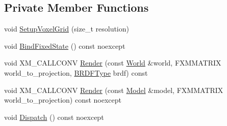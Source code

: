\subsection*{Private Member Functions}
\begin{DoxyCompactItemize}
\item 
void \hyperlink{classmage_1_1rendering_1_1_voxelization_pass_a09f3b3c1a08b28c3815fb4fa1f0611f5}{Setup\+Voxel\+Grid} (size\+\_\+t resolution)
\item 
void \hyperlink{classmage_1_1rendering_1_1_voxelization_pass_ae69d6465ab918f12940339436fe56c56}{Bind\+Fixed\+State} () const noexcept
\item 
void X\+M\+\_\+\+C\+A\+L\+L\+C\+O\+NV \hyperlink{classmage_1_1rendering_1_1_voxelization_pass_a04fc0339069c463b3b2a278ea1491efd}{Render} (const \hyperlink{classmage_1_1rendering_1_1_world}{World} \&world, F\+X\+M\+M\+A\+T\+R\+IX world\+\_\+to\+\_\+projection, \hyperlink{namespacemage_1_1rendering_a13c5e70586af4ce254146074ec055bf6}{B\+R\+D\+F\+Type} brdf) const
\item 
void X\+M\+\_\+\+C\+A\+L\+L\+C\+O\+NV \hyperlink{classmage_1_1rendering_1_1_voxelization_pass_aa993ec5ff093f3948f13bf3187a11e6c}{Render} (const \hyperlink{classmage_1_1rendering_1_1_model}{Model} \&model, F\+X\+M\+M\+A\+T\+R\+IX world\+\_\+to\+\_\+projection) const noexcept
\item 
void \hyperlink{classmage_1_1rendering_1_1_voxelization_pass_a5026abcbe3aad3627e96ee055df8b842}{Dispatch} () const noexcept
\end{DoxyCompactItemize}
